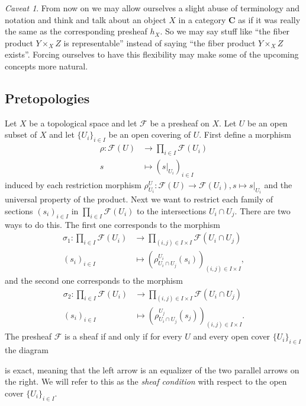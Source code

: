 \documentclass[12pt,a4paper]{amsart}
\theoremstyle{plain}
\theoremstyle{definition}
\theoremstyle{remark}
\newtheorem{cav}{Caveat}
\begin{document}
\begin{cav}
  From now on we may allow ourselves a slight abuse of terminology and notation and think and talk about an object $X$ in a category $\mathbf{C}$ as if it was really the same as the corresponding presheaf $h_{X}$.
  So we may say stuff like ``the fiber product $Y \times_{X} Z$ is representable'' instead of saying ``the fiber product $Y \times_{X} Z$ exists''.
  Forcing ourselves to have this flexibility may make some of the upcoming concepts more natural.
\end{cav}

\subsection{Pretopologies}

Let $X$ be a topological space and let $\mathscr{F}$ be a presheaf on $X$.
Let $U$ be an open subset of $X$ and let $\{U_{i}\}_{i \in I}$ be an open covering of $U$.
First define a morphism
\begin{align*}
  \rho \colon \mathscr{F}(U) & \to \prod_{i \in I} \mathscr{F}(U_{i}) \\
  s & \mapsto (s|_{U_{i}})_{i \in I}
\end{align*}
induced by each restriction morphism $\rho^{U}_{U_{i}} \colon \mathscr{F}(U) \to \mathscr{F}(U_{i}), s \mapsto s|_{U_{i}}$ and the universal property of the product.
Next we want to restrict each family of sections $(s_{i})_{i \in I}$ in $\prod_{i \in I} \mathscr{F}(U_{i})$ to the intersections $U_{i} \cap U_{j}$.
There are two ways to do this.
The first one corresponds to the morphism
\begin{align*}
  \sigma_{1} \colon \prod_{i \in I} \mathscr{F}(U_{i}) & \to \prod_{(i, j) \in I \times I} \mathscr{F}(U_{i} \cap U_{j}) \\
  (s_{i})_{i \in I} & \mapsto \left(\rho^{U_{i}}_{U_{i} \cap U_{j}}(s_{i})\right)_{(i, j) \in I \times I},
\end{align*}
and the second one corresponds to the morphism
\begin{align*}
  \sigma_{2} \colon \prod_{i \in I} \mathscr{F}(U_{i}) & \to \prod_{(i, j) \in I \times I} \mathscr{F}(U_{i} \cap U_{j}) \\
  (s_{i})_{i \in I} & \mapsto \left(\rho^{U_{j}}_{U_{i} \cap U_{j}}(s_{j})\right)_{(i, j) \in I \times I}.
\end{align*}
The presheaf $\mathscr{F}$ is a sheaf if and only if for every $U$ and every open cover $\{U_{i}\}_{i \in I}$ the diagram
\begin{center}
\end{center}
is exact, meaning that the left arrow is an equalizer of the two parallel arrows on the right.
We will refer to this as the \textit{sheaf condition} with respect to the open cover $\{ U_{i} \}_{i \in I}$.
\end{document}
